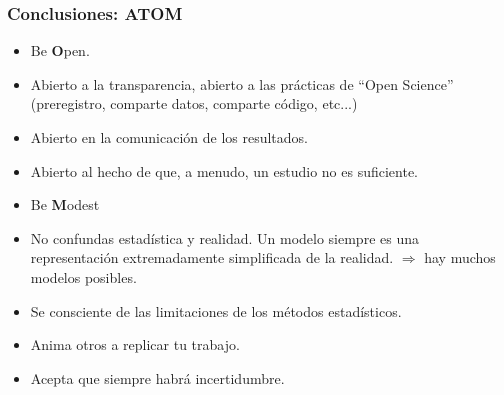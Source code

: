 \documentclass[9pt]{beamer}
\begin{document}
\begin{frame}
  \frametitle{Conclusiones: ATOM}

  \begin{block}{}
  \begin{itemize}
  \item Be \textbf{\Huge O}pen.
  \end{itemize}
\end{block}

\begin{itemize}
\item<2-> Abierto a la transparencia, abierto a las prácticas de
  ``Open Science'' (preregistro, comparte datos, comparte código, etc...)
\item<3-> Abierto en la comunicación de los resultados.
\item<4-> Abierto al hecho de que, a menudo, un estudio no es suficiente. 
\end{itemize}
\begin{block}{}
  \begin{itemize}
  \item Be \textbf{\Huge M}odest
  \end{itemize}
  
\end{block}
\begin{itemize}
\item<6-> No confundas estadística y realidad. Un modelo siempre es
  una representación extremadamente simplificada de la
  realidad. $\Rightarrow$ hay muchos modelos posibles.
\item<7-> Se consciente de las limitaciones de los métodos estadísticos.
\item<8-> Anima otros a replicar tu trabajo.

\item<9-> Acepta que siempre habrá incertidumbre.
\end{itemize}

\end{frame}
\end{document}

